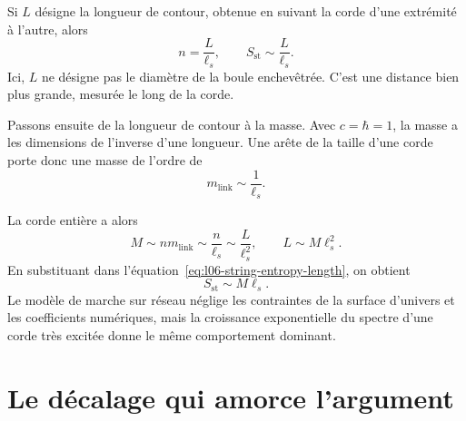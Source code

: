 Si \(L\) désigne la longueur de contour, obtenue en suivant la corde d’une extrémité à l’autre, alors
\begin{equation}
n=\frac{L}{\ell_s},
\qquad
S_{\mathrm{st}}\sim\frac{L}{\ell_s}.
\label{eq:l06-string-entropy-length}
\end{equation}
Ici, \(L\) ne désigne pas le diamètre de la boule enchevêtrée. C’est une distance bien plus grande, mesurée le long de la corde.

Passons ensuite de la longueur de contour à la masse. Avec \(c=\hbar=1\), la masse a les dimensions de l’inverse d’une longueur. Une arête de la taille d’une corde porte donc une masse de l’ordre de
\begin{equation}
m_{\mathrm{link}}\sim\frac{1}{\ell_s}.
\label{eq:l06-link-mass}
\end{equation}

\begin{classroomqa}
\end{classroomqa}

La corde entière a alors
\begin{equation}
M\sim n m_{\mathrm{link}}
\sim\frac{n}{\ell_s}
\sim\frac{L}{\ell_s^2},
\qquad
L\sim M\ell_s^2.
\label{eq:l06-string-mass}
\end{equation}En substituant dans l’équation~\eqref{eq:l06-string-entropy-length}, on obtient
\begin{equation}
S_{\mathrm{st}}\sim M\ell_s.
\label{eq:l06-string-entropy-mass}
\end{equation}Le modèle de marche sur réseau néglige les contraintes de la surface d’univers et les coefficients numériques, mais la croissance exponentielle du spectre d’une corde très excitée donne le même comportement dominant.

\section{Le décalage qui amorce l’argument}

